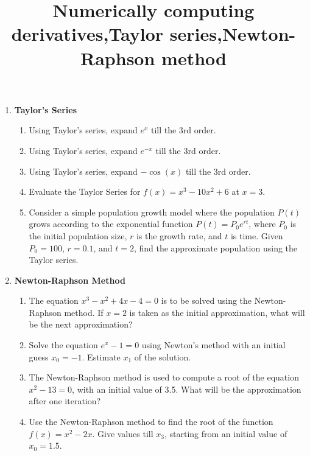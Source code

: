 \documentclass[11pt]{article}
\title{Numerically computing derivatives,Taylor series,Newton-Raphson method}
\author{}
\begin{document}
\maketitle
\thispagestyle{fancy}

\begin{enumerate}
    \item \textbf{Taylor's Series}
    \begin{enumerate}
        \item Using Taylor's series, expand \( e^x \) till the 3rd order.
        
        \item Using Taylor's series, expand \( e^{-x} \) till the 3rd order.
        
        \item Using Taylor's series, expand \( -\cos(x) \) till the 3rd order.
        
        \item Evaluate the Taylor Series for \( f(x) = x^3 - 10x^2 + 6 \) at \( x = 3 \).
        
        \item Consider a simple population growth model where the population \( P(t) \) grows according to the exponential function \( P(t) = P_0 e^{rt} \), where \( P_0 \) is the initial population size, \( r \) is the growth rate, and \( t \) is time. Given \( P_0 = 100 \), \( r = 0.1 \), and \( t = 2 \), find the approximate population using the Taylor series.
    \end{enumerate}

    \item \textbf{Newton-Raphson Method}
    \begin{enumerate}
        \item The equation \( x^3 - x^2 + 4x - 4 = 0 \) is to be solved using the Newton-Raphson method. If \( x = 2 \) is taken as the initial approximation, what will be the next approximation?

        \item Solve the equation \( e^x - 1 = 0 \) using Newton's method with an initial guess \( x_0 = -1 \). Estimate \( x_1 \) of the solution.

        \item The Newton-Raphson method is used to compute a root of the equation \( x^2 - 13 = 0 \), with an initial value of 3.5. What will be the approximation after one iteration?

        \item Use the Newton-Raphson method to find the root of the function \( f(x) = x^2 - 2x \). Give values till \( x_3 \), starting from an initial value of \( x_0 = 1.5 \).


\end{enumerate}
\end{enumerate}
\end{document}
